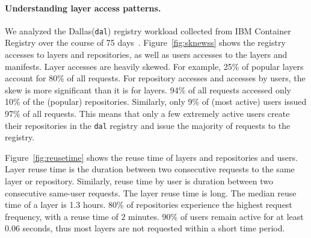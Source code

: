 


\paragraph{Understanding layer access patterns.}
We analyzed the Dallas(\texttt{dal}) registry workload collected from IBM Container Registry over the course of 75 days~\cite{dockerworkload}. 
Figure~\ref{fig:sknewss} shows the registry accesses to layers and repositories, as well as users accesses to the layers and manifests.
Layer accesses are heavily skewed. For example, 25\% of popular layers account for 80\% of all requests. 
For repository accesses and accesses by users, the skew is more significant than it is for layers. %
94\% of all requests accessed only 10\% of the (popular) repositories. Similarly, only 9\% of (most active) users issued 97\% of all requests. 
This means that only a few extremely active users create their repositories in the \texttt{dal} registry and issue the majority of requests to the registry.

Figure~\ref{fig:reusetime} shows the reuse time of layers and repositories and users.
Layer reuse time is the duration between two consecutive requests to the same layer or repository. Similarly,
reuse time by user is duration between two consecutive same-user requests.
The layer reuse time is long.
The median reuse time of a layer is 1.3 hours. 80\% of repositories experience the highest request frequency, with a reuse time of $2$ minutes. 
90\% of users remain active for at least $0.06$ seconds, thus most layers are not requested within a short time period.

